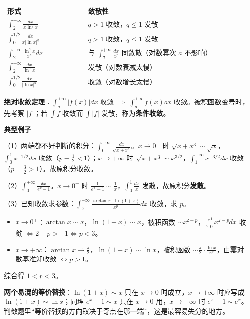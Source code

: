\documentclass[11pt,openany,UTF8]{ctexbook}
\begin{document}
\begingroup\small\setlength{\tabcolsep}{4.0pt}
\begin{longtable}{@{}L{0.3479\linewidth}L{0.5978\linewidth}@{}}
\toprule
\textbf{形式} & \textbf{敛散性} \\
\midrule
\endhead
$\displaystyle\int_2^{+\infty}\frac{dx}{x\ln^qx}$ & $q>1$ 收敛，$q\leq1$ 发散 \\
$\displaystyle\int_0^{1/2}\frac{dx}{x\lvert\ln x\rvert^q}$ & $q>1$ 收敛，$q\leq1$ 发散 \\
$\displaystyle\int_2^{+\infty}\frac{\ln^ax}{x^p}dx$ & 与 $\displaystyle\int_2^{+\infty}\frac{dx}{x^p}$ 同敛散（对数幂次 $a$ 不影响） \\
$\displaystyle\int_2^{+\infty}\frac{dx}{\ln^ax}$ & 发散（对数衰减太慢） \\
$\displaystyle\int_0^{1/2}\frac{dx}{\lvert\ln x\rvert^a}$ & 收敛（对数增长太慢） \\
\bottomrule
\end{longtable}
\endgroup

\textbf{绝对收敛定理}：$\int_a^{+\infty}\lvert f(x)\rvert dx$ 收敛 $\Rightarrow$ $\int_a^{+\infty}f(x)dx$ 收敛。被积函数变号时，先考察 $\lvert f\rvert$；若 $\int f$ 收敛而 $\int\lvert f\rvert$ 发散，称为\textbf{条件收敛}。

\textbf{典型例子}

（1）两端都不好判断的积分：$\displaystyle\int_0^{+\infty}\frac{dx}{\sqrt{x+x^3}}$。$x\to0^+$ 时 $\sqrt{x+x^3}\sim\sqrt{x}$，$\int_0^1x^{-1/2}dx$ 收敛（$p=\frac{1}{2}<1$）；$x\to+\infty$ 时 $\sqrt{x+x^3}\sim x^{3/2}$，$\int_1^{+\infty}x^{-3/2}dx$ 收敛（$p=\frac{3}{2}>1$）。故原积分收敛。

（2）$\displaystyle\int_0^{+\infty}\frac{dx}{e^x-1}$。$x\to0^+$ 时 $\frac{1}{e^x-1}\sim\frac{1}{x}$，$\int_0^1\frac{dx}{x}$ 发散，故原积分\textbf{发散}。

（3）已知收敛求参数：$\displaystyle\int_0^{+\infty}\frac{\arctan x\cdot\ln(1+x)}{x^p}dx$ 收敛，求 $p$。

\begin{itemize}
\item $x\to0^+$：$\arctan x\sim x$，$\ln(1+x)\sim x$，被积函数 $\sim x^{2-p}$，$\int_0^1x^{2-p}dx$ 收敛 $\iff 2-p>-1 \iff p<3$。
\item $x\to+\infty$：$\arctan x\to\frac{\pi}{2}$，$\ln(1+x)\sim\ln x$，被积函数 $\sim\frac{\pi}{2}\cdot\frac{\ln x}{x^p}$，由幂对数基准知收敛 $\iff p>1$。
\end{itemize}
综合得 $1<p<3$。

\textbf{两个易混的等价替换}：$\ln(1+x)\sim x$ 只在 $x\to0$ 时成立，$x\to+\infty$ 时应写成 $\ln(1+x)\sim\ln x$；同理 $e^{x}-1\sim x$ 只在 $x\to0$ 用，$x\to+\infty$ 时 $e^{x}-1\sim e^{x}$。判敛题里“等价替换的方向取决于奇点在哪一端”，这是最容易失分的地方。
\end{document}
